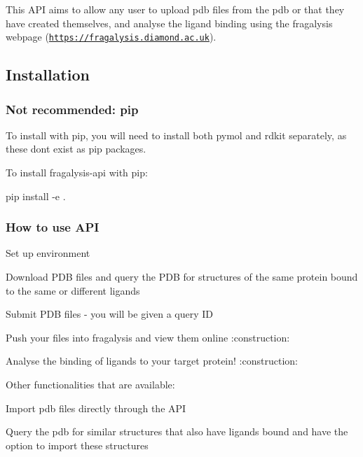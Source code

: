 This A\+PI aims to allow any user to upload pdb files from the pdb or that they have created themselves, and analyse the ligand binding using the fragalysis webpage (\href{https://fragalysis.diamond.ac.uk}{\tt https\+://fragalysis.\+diamond.\+ac.\+uk}).

\subsection*{Installation}

\subsubsection*{Not recommended\+: pip}

To install with pip, you will need to install both pymol and rdkit separately, as these don\textquotesingle{}t exist as pip packages.

To install fragalysis-\/api with pip\+:


\begin{DoxyCode}
pip install -e .
\end{DoxyCode}


\subsubsection*{How to use A\+PI}


\begin{DoxyEnumerate}
\item Set up environment
\item Download P\+DB files and query the P\+DB for structures of the same protein bound to the same or different ligands
\item Submit P\+DB files -\/ you will be given a query ID
\item Push your files into fragalysis and view them online \+:construction\+:
\item Analyse the binding of ligands to your target protein! \+:construction\+:
\end{DoxyEnumerate}

Other functionalities that are available\+:
\begin{DoxyItemize}
\item Import pdb files directly through the A\+PI
\item Query the pdb for similar structures that also have ligands bound and have the option to import these structures
\end{DoxyItemize}

